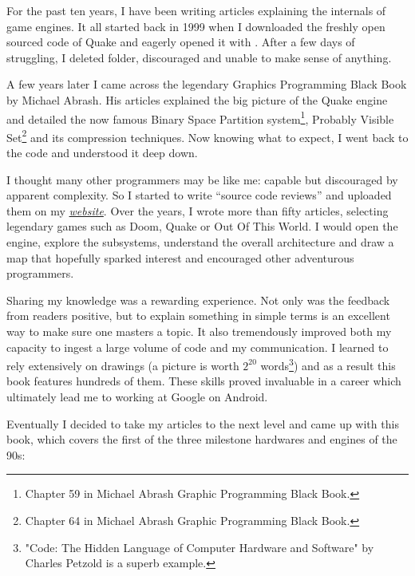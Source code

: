 \documentclass[book.tex]{subfiles}
\begin{document}
For the past ten years, I have been writing articles explaining the internals of game engines. It all started back in 1999 when I downloaded the freshly open sourced code of \mbox{Quake} and eagerly opened it with . After a few days of struggling, I deleted  folder, discouraged and unable to make sense of anything.

\bigskip

A few years later I came across the legendary Graphics Programming Black Book by Michael Abrash. His articles explained the big picture of the Quake engine and detailed the now famous Binary Space Partition system\footnote{Chapter 59 in Michael Abrash Graphic Programming Black Book.}, Probably Visible Set\footnote{Chapter 64 in Michael Abrash Graphic Programming Black Book.} and its compression techniques. Now knowing what to expect, I went back to the code and understood it deep down.

\bigskip

I thought many other programmers may be like me: capable but discouraged by apparent complexity. So I started to write ``source  code reviews'' and uploaded them on my
\href{http://fabiensanglard.net}{\textit{website}}. Over the years, I wrote more than fifty articles, selecting legendary games such as Doom, Quake or Out Of This World. I would open the engine, explore the subsystems, understand the overall architecture and draw a map that hopefully sparked interest and encouraged other adventurous programmers.

\bigskip

Sharing my knowledge was a rewarding experience. Not only was the feedback from readers positive, but to explain something in simple terms is an excellent way to make sure one masters a topic. It also tremendously improved both my capacity to ingest a large volume of code and my communication. I learned to rely extensively on drawings (a picture is worth $2^{20}$ words\footnote{"Code: The Hidden Language of Computer Hardware and Software" by Charles Petzold is a superb example.}) and as a result this book features hundreds of them. These skills proved invaluable in a career which ultimately lead me to working at Google on Android.

\newpage

Eventually I decided to take my articles to the next level and came up with this book, which covers the first of the three milestone hardwares and engines of the 90s:
\end{document}
